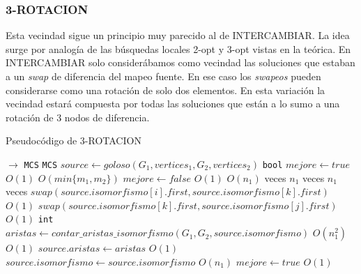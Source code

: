 \subsubsection{3-ROTACION}
Esta vecindad sigue un principio muy parecido al de INTERCAMBIAR. La idea surge por analogía de las búsquedas locales 2-opt y 3-opt vistas en la teórica. En INTERCAMBIAR solo considerábamos como vecindad las soluciones que estaban a un \emph{swap} de diferencia del mapeo fuente. En ese caso los \emph{swapeos} pueden considerarse como una rotación de solo dos elementos. En esta variación la vecindad estará compuesta por todas las soluciones que están a lo sumo a una rotación de 3 nodos de diferencia.

\begin{algorithm}[H]
  \small
  \begin{algorithmic}[1]
  \caption{Pseudocódigo de 3-ROTACION}
  \label{algo:5-3}
    $\rightarrow$ \texttt{MCS}
      \State \texttt{MCS} $source \gets goloso(G_1, vertices_1, G_2, vertices_2)$
      \State \texttt{bool} $mejore \gets true$
      \Comment $O(1)$
      \Comment $O(min\{m_1, m_2\})$
        \State $mejore \gets false$
        \Comment $O(1)$
        \Comment $O(n_1)$ veces
          \Comment $n_1$ veces
            \Comment $n_1$ veces
              \State $swap(source.isomorfismo[i].first, source.isomorfismo[k].first)$
              \Comment $O(1)$
              \State $swap(source.isomorfismo[k].first, source.isomorfismo[j].first)$
              \Comment $O(1)$
              \State \texttt{int} $aristas \gets contar\_aristas\_isomorfismo(G_1, G_2, source.isomorfismo)$
              \Comment $O(n_1^2)$
              \Comment $O(1)$
                \State $source.aristas \gets aristas$ 
                \Comment $O(1)$             
                \State $source.isomorfismo \gets source.isomorfismo$
                \Comment $O(n_1)$
                \State $mejore \gets true$
                \Comment $O(1)$
              \EndIf
            \EndFor
          \EndFor
        \EndFor
      \EndWhile
    \EndProcedure
  \end{algorithmic}
\end{algorithm}

